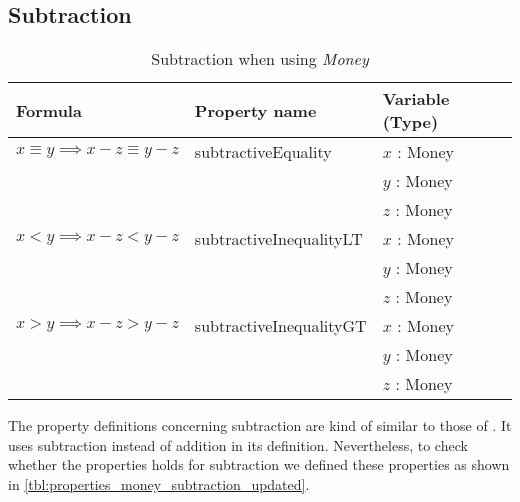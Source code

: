 \subsection*{Subtraction}
\label{ssct:properties_subtraction_updated}
\begin{table}[!ht]
\centering
\begin{tabular}{lll}
\hline
                        \textbf{Formula}                         & \textbf{Property name}  & \textbf{Variable (Type)} \\ \hline
\rowcolor[HTML]{EFEFEF} $x \equiv y \implies x - z \equiv y - z$ & subtractiveEquality     & $x$ : Money              \\
\rowcolor[HTML]{EFEFEF}                                          &                         & $y$ : Money              \\
\rowcolor[HTML]{EFEFEF}                                          &                         & $z$ : Money              \\
                        $x < y \implies x - z < y - z$           & subtractiveInequalityLT & $x$ : Money              \\
                                                                 &                         & $y$ : Money              \\
                                                                 &                         & $z$ : Money              \\
\rowcolor[HTML]{EFEFEF} $x > y \implies x - z > y - z$           & subtractiveInequalityGT & $x$ : Money              \\
\rowcolor[HTML]{EFEFEF}                                          &                         & $y$ : Money              \\
\rowcolor[HTML]{EFEFEF}                                          &                         & $z$ : Money              \\ \hline
\end{tabular}
\caption{Subtraction when using \textit{Money}}
\label{tbl:properties_money_subtraction_updated}
\end{table}
\FloatBarrier\noindent
The property definitions concerning subtraction are kind of similar to those of
. It uses subtraction instead of
addition in its definition. Nevertheless, to check whether the properties holds
for subtraction we defined these properties as shown in
\autoref{tbl:properties_money_subtraction_updated}.
\clearpage %

